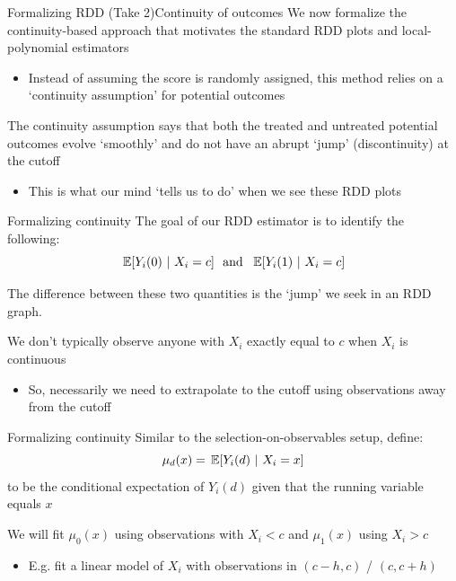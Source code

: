 \documentclass[aspectratio=169,t,11pt,table]{beamer}
\begin{document}
\begin{frame}{Formalizing RDD (Take 2)}{Continuity of outcomes}
  We now formalize the continuity-based approach that motivates the standard RDD plots and local-polynomial estimators
  \begin{itemize}
    \item Instead of assuming the score is randomly assigned, this method relies on a `continuity assumption' for potential outcomes
  \end{itemize}

  \pause
  \bigskip
  The \alert{continuity assumption} says that both the treated and untreated potential outcomes evolve `smoothly' and do not have an abrupt `jump' (discontinuity) at the cutoff
  \begin{itemize}
    \item This is what our mind `tells us to do' when we see these RDD plots
  \end{itemize}
\end{frame}


\begin{frame}{Formalizing continuity}
  The goal of our RDD estimator is to identify the following:
  $$
    \expec{Y_i(0)}{X_i = c} \ \text{ and }\ \expec{Y_i(1)}{X_i = c}
  $$

  The difference between these two quantities is the `jump' we seek in an RDD graph.

  \bigskip
  We don't typically observe anyone with $X_i$ exactly equal to $c$ when $X_i$ is continuous
  \begin{itemize}
    \item So, necessarily we need to extrapolate to the cutoff using observations away from the cutoff
  \end{itemize}
\end{frame}

\begin{frame}{Formalizing continuity}
  Similar to the selection-on-observables setup, define:
  $$
    \mu_d(x) = \expec{Y_i(d)}{X_i = x}
  $$
  to be the conditional expectation of $Y_i(d)$ given that the running variable equals $x$

  \bigskip
  We will fit $\mu_0(x)$ using observations with $X_i < c$ and $\mu_1(x)$ using $X_i > c$
  \begin{itemize}
    \item E.g. fit a linear model of $X_i$ with observations in $(c - h, c)$ / $(c, c+h)$
  \end{itemize}
\end{frame}
\end{document}
